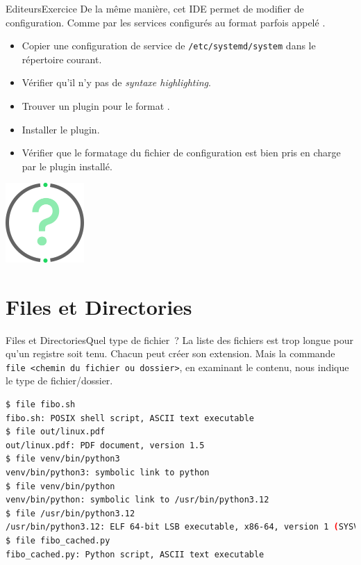 \documentclass{beamer}
\begin{document}
    \begin{frame}{Editeurs}{Exercice \execcounterdispinc}
        De la même manière, cet IDE permet de modifier de configuration.
        Comme par les services configurés au format parfois appelé .
        \begin{itemize}
            \item Copier une configuration de service de \lstinline{/etc/systemd/system} dans le répertoire courant.
            \item Vérifier qu'il n'y pas de \textit{syntaxe highlighting}.
            \item Trouver un plugin pour le format .
            \item Installer le plugin.
            \item Vérifier que le formatage du fichier de configuration est bien pris en charge par le plugin installé.
        \end{itemize}
        \bigbreak
        \centering
        \includegraphics[width=3cm]{image/question-mark}
    \end{frame}


    \section{Files et Directories}\label{sec:files-directories}

    \begin{frame}[fragile]{Files et Directories}{Quel type de fichier~?}
        La liste des fichiers est trop longue pour qu'un registre soit tenu.
        Chacun peut créer son extension.
        Mais la commande \lstinline{file <chemin du fichier ou dossier>}, en examinant le contenu, nous indique le type de fichier/dossier.
        \begin{lstlisting}[language=bash]
$ file fibo.sh
fibo.sh: POSIX shell script, ASCII text executable
$ file out/linux.pdf
out/linux.pdf: PDF document, version 1.5
$ file venv/bin/python3
venv/bin/python3: symbolic link to python
$ file venv/bin/python
venv/bin/python: symbolic link to /usr/bin/python3.12
$ file /usr/bin/python3.12
/usr/bin/python3.12: ELF 64-bit LSB executable, x86-64, version 1 (SYSV), dynamically linked, interpreter /lib64/ld-linux-x86-64.so.2, BuildID[sha1]=ccd329aaf9256b96135a9e3f97cbf4c3829377e1, for GNU/Linux 3.2.0, stripped
$ file fibo_cached.py
fibo_cached.py: Python script, ASCII text executable
        \end{lstlisting}
    \end{frame}
\end{document}
